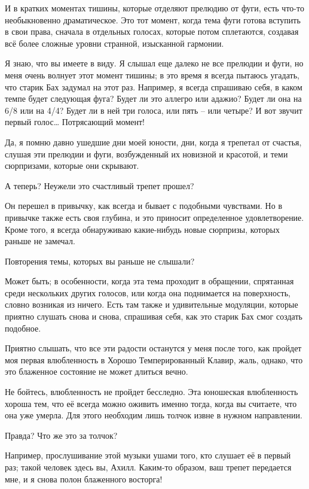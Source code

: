 \documentclass[../main.tex]{subfiles}
\begin{document}
\begin{dialogue}
 И в кратких моментах тишины, которые отделяют прелюдию от фуги, есть что-то необыкновенно драматическое. Это тот момент, когда тема фуги готова вступить в свои права, сначала в отдельных голосах, которые потом сплетаются, создавая всё более сложные уровни странной, изысканной гармонии.

 Я знаю, что вы имеете в виду. Я слышал еще далеко не все прелюдии и фуги, но меня очень волнует этот момент тишины; в это время я всегда пытаюсь угадать, что старик Бах задумал на этот раз. Например, я всегда спрашиваю себя, в каком темпе будет следующая фуга? Будет ли это аллегро или адажио? Будет ли она на 6/8 или на 4/4? Будет ли в ней три голоса, или пять \--- или четыре? И вот звучит первый голос\ldots{} Потрясающий момент!

 Да, я помню давно ушедшие дни моей юности, дни, когда я трепетал от счастья, слушая эти прелюдии и фуги, возбужденный их новизной и красотой, и теми сюрпризами, которые они скрывают.

 А теперь? Неужели это счастливый трепет прошел?

 Он перешел в привычку, как всегда и бывает с подобными чувствами. Но в привычке также есть своя глубина, и это приносит определенное удовлетворение. Кроме того, я всегда обнаруживаю какие-нибудь новые сюрпризы, которых раньше не замечал.

 Повторения темы, которых вы раньше не слышали?

 Может быть; в особенности, когда эта тема проходит в обращении, спрятанная среди нескольких других голосов, или когда она поднимается на поверхность, словно возникая из ничего. Есть там также и удивительные модуляции, которые приятно слушать снова и снова, спрашивая себя, как это старик Бах смог создать подобное.

 Приятно слышать, что все эти радости останутся у меня после того, как пройдет моя первая влюбленность в Хорошо Темперированный Клавир, жаль, однако, что это блаженное состояние не может длиться вечно.

 Не бойтесь, влюбленность не пройдет бесследно. Эта юношеская влюбленность хороша тем, что её всегда можно оживить именно тогда, когда вы считаете, что она уже умерла. Для этого необходим лишь толчок извне в нужном направлении.

 Правда? Что же это за толчок?

 Например, прослушивание этой музыки ушами того, кто слушает её в первый раз; такой человек здесь вы, Ахилл. Каким-то образом, ваш трепет передается мне, и я снова полон блаженного восторга!


\end{dialogue}
\end{document}
